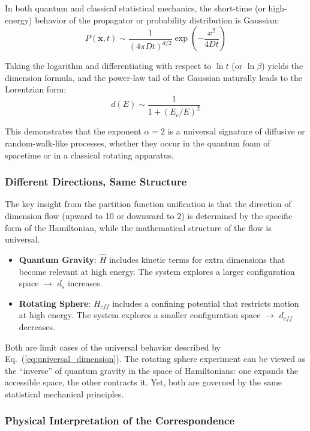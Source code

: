 \documentclass[12pt,a4paper]{article}
\begin{document}
In both quantum and classical statistical mechanics, the short-time (or high-energy) behavior of the propagator or probability distribution is Gaussian:
\begin{equation}
    P(\mathbf{x}, t) \sim \frac{1}{(4\pi D t)^{d/2}} \exp\left(-\frac{x^2}{4Dt}\right)
\end{equation}

Taking the logarithm and differentiating with respect to $\ln t$ (or $\ln \beta$) yields the dimension formula, and the power-law tail of the Gaussian naturally leads to the Lorentzian form:
\begin{equation}
    d(E) \sim \frac{1}{1+(E_c/E)^2}
\end{equation}

This demonstrates that the exponent $\alpha = 2$ is a universal signature of diffusive or random-walk-like processes, whether they occur in the quantum foam of spacetime or in a classical rotating apparatus.

\subsubsection{Different Directions, Same Structure}

The key insight from the partition function unification is that the direction of dimension flow (upward to 10 or downward to 2) is determined by the specific form of the Hamiltonian, while the mathematical structure of the flow is universal.

\begin{itemize}
    \item \textbf{Quantum Gravity}: $\hat{H}$ includes kinetic terms for extra dimensions that become relevant at high energy. The system explores a larger configuration space $\rightarrow$ $d_s$ increases.
    \item \textbf{Rotating Sphere}: $H_{eff}$ includes a confining potential that restricts motion at high energy. The system explores a smaller configuration space $\rightarrow$ $d_{eff}$ decreases.
\end{itemize}

Both are limit cases of the universal behavior described by Eq.~(\ref{eq:universal_dimension}). The rotating sphere experiment can be viewed as the ``inverse'' of quantum gravity in the space of Hamiltonians: one expands the accessible space, the other contracts it. Yet, both are governed by the same statistical mechanical principles.

\subsubsection{Physical Interpretation of the Correspondence}
\end{document}
